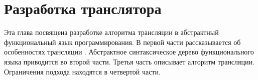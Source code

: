 \section{Разработка транслятора}
\label{translator}

Эта глава посвящена разработке алгоритма трансляции \miniKanren{} в абстрактный функциональный язык программирования.
В первой части рассказывается об особенностях трансляции \miniKanren{}.
Абстрактное синтаксическое дерево функционального языка приводится во второй части.
Третья часть описывает алгоритм трансляции.
Ограничения подхода находятся в четвертой части.





